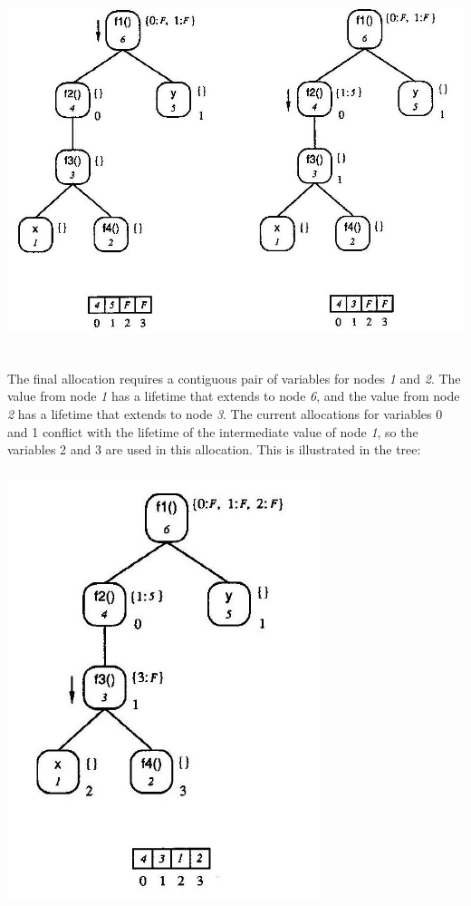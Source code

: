{\centering{}
\includegraphics[width=6.0in,height=4.2in]{kw/figure8-3.png}
\par}

The final allocation requires a contiguous pair of variables for nodes
\textit{1} and \textit{2}. The value from node \textit{1} has a
lifetime that extends to node \textit{6}, and the value from node
\textit{2} has a lifetime that extends to node \textit{3}. The current
allocations for variables 0 and 1 conflict with the lifetime of the
intermediate value of node \textit{1}, so the variables 2 and 3 are
used in this allocation. This is illustrated in the tree:

{\centering{}
\includegraphics[width=3.6in,height=5.0in]{kw/figure8-5.png}
\par}


